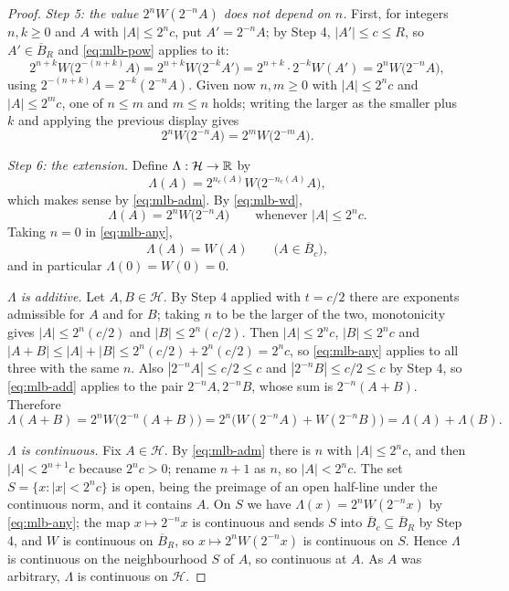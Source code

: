 \begin{proof}
\emph{Step 5: the value $2^nW(2^{-n}A)$ does not depend on $n$.} First, for
integers $n,k\ge0$ and $A$ with $|A|\le2^nc$, put $A'=2^{-n}A$; by Step 4,
$|A'|\le c\le R$, so $A'\in\overline B_R$ and \eqref{eq:mlb-pow} applies to it:
\[
  2^{n+k}W\bigl(2^{-(n+k)}A\bigr)=2^{n+k}W\bigl(2^{-k}A'\bigr)
   =2^{n+k}\cdot2^{-k}W(A')=2^nW\bigl(2^{-n}A\bigr),
\]
using $2^{-(n+k)}A=2^{-k}(2^{-n}A)$. Given now $n,m\ge0$ with $|A|\le2^nc$ and
$|A|\le2^mc$, one of $n\le m$ and $m\le n$ holds; writing the larger as the
smaller plus $k$ and applying the previous display gives
\begin{equation}\label{eq:mlb-wd}
  2^nW\bigl(2^{-n}A\bigr)=2^mW\bigl(2^{-m}A\bigr).
\end{equation}

\emph{Step 6: the extension.} Define $\Lambda:\mathcal H\to\mathbb{R}$ by
\[
  \Lambda(A)=2^{n_c(A)}W\bigl(2^{-n_c(A)}A\bigr),
\]
which makes sense by \eqref{eq:mlb-adm}. By \eqref{eq:mlb-wd},
\begin{equation}\label{eq:mlb-any}
  \Lambda(A)=2^nW\bigl(2^{-n}A\bigr)\qquad\text{whenever }|A|\le2^nc .
\end{equation}
Taking $n=0$ in \eqref{eq:mlb-any},
\begin{equation}\label{eq:mlb-agree}
  \Lambda(A)=W(A)\qquad\bigl(A\in\overline B_c\bigr),
\end{equation}
and in particular $\Lambda(0)=W(0)=0$.

\emph{$\Lambda$ is additive.} Let $A,B\in\mathcal H$. By Step 4 applied with
$t=c/2$ there are exponents admissible for $A$ and for $B$; taking $n$ to be the
larger of the two, monotonicity gives $|A|\le2^n(c/2)$ and $|B|\le2^n(c/2)$.
Then $|A|\le2^nc$, $|B|\le2^nc$ and
$|A+B|\le|A|+|B|\le2^n(c/2)+2^n(c/2)=2^nc$, so \eqref{eq:mlb-any} applies to all
three with the same $n$. Also $|2^{-n}A|\le c/2\le c$ and
$|2^{-n}B|\le c/2\le c$ by Step 4, so \eqref{eq:mlb-add} applies to the pair
$2^{-n}A,2^{-n}B$, whose sum is $2^{-n}(A+B)$. Therefore
\[
  \Lambda(A+B)=2^nW\bigl(2^{-n}(A+B)\bigr)
   =2^n\bigl(W(2^{-n}A)+W(2^{-n}B)\bigr)=\Lambda(A)+\Lambda(B).
\]

\emph{$\Lambda$ is continuous.} Fix $A\in\mathcal H$. By \eqref{eq:mlb-adm} there
is $n$ with $|A|\le2^nc$, and then $|A|<2^{n+1}c$ because $2^nc>0$; rename
$n+1$ as $n$, so $|A|<2^nc$. The set $S=\{x:|x|<2^nc\}$ is open, being the
preimage of an open half-line under the continuous norm, and it contains $A$. On
$S$ we have $\Lambda(x)=2^nW(2^{-n}x)$ by \eqref{eq:mlb-any}; the map
$x\mapsto2^{-n}x$ is continuous and sends $S$ into $\overline B_c\subseteq
\overline B_R$ by Step 4, and $W$ is continuous on $\overline B_R$, so
$x\mapsto2^nW(2^{-n}x)$ is continuous on $S$. Hence $\Lambda$ is continuous on
the neighbourhood $S$ of $A$, so continuous at $A$. As $A$ was arbitrary,
$\Lambda$ is continuous on $\mathcal H$.


\end{proof}
